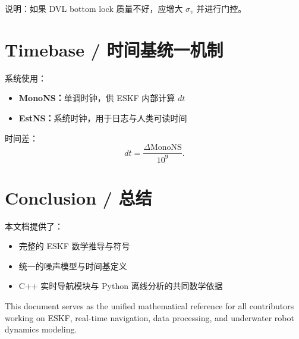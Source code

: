 \documentclass[12pt,a4paper]{ctexart} %
\begin{document}
说明：如果 DVL bottom lock 质量不好，应增大 $\sigma_v$ 并进行门控。

\section{Timebase / 时间基统一机制}

系统使用：
\begin{itemize}
    \item \textbf{MonoNS：}单调时钟，供 ESKF 内部计算 $dt$
    \item \textbf{EstNS：}系统时钟，用于日志与人类可读时间
\end{itemize}

时间差：
\[
dt = \frac{\Delta \mathrm{MonoNS}}{10^9}.
\]

\section{Conclusion / 总结}

本文档提供了：
\begin{itemize}
  \item 完整的 ESKF 数学推导与符号
  \item 统一的噪声模型与时间基定义
  \item C++ 实时导航模块与 Python 离线分析的共同数学依据
\end{itemize}

This document serves as the unified mathematical reference for all 
contributors working on ESKF, real-time navigation, data processing, 
and underwater robot dynamics modeling.
\end{document}

